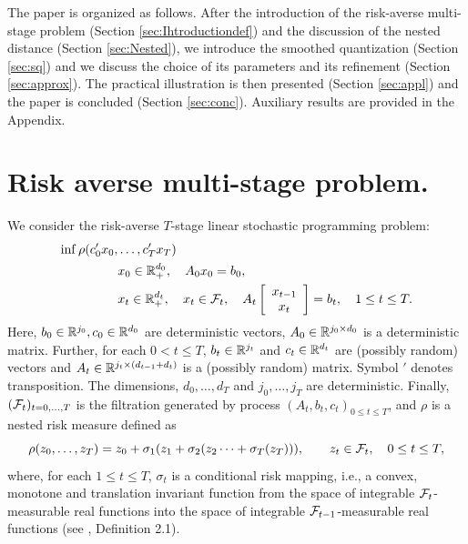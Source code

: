 \documentclass{article}              %
\begin{document}
The paper is organized as follows. After the introduction of the risk-averse
multi-stage problem (Section \ref{sec:Ihtroductiondef}) and the discussion
of the nested distance (Section \ref{sec:Nested}), we introduce the
smoothed quantization (Section \ref{sec:sq}) and we discuss the choice
of its parameters and its refinement (Section \ref{sec:approx}).
The practical illustration is then presented (Section \ref{sec:appl})
and the paper is concluded (Section \ref{sec:conc}). Auxiliary results
are provided in the Appendix.

\section{\label{sec:Ihtroductiondef} Risk averse multi-stage problem.}

We consider the risk-averse $T$-stage linear stochastic programming
problem:
\begin{equation}\label{eq:p}
\begin{split}
\inf\rho(c'_{0}x_{0},&\dots,c'_{T}x_{T})\\
&x_{0}\in\mathbb{R}_{+}^{d_{0}},\quad A_{0}x_{0}=b_{0},\\
&x_{t}\in\mathbb{R}_{+}^{d_{t}},\quad x_{t}\in\mathcal{F}_{t},\quad A_{t}
\left[\begin{array}{c}
x_{t-1}\\
x_{t}
\end{array}\right]=b_{t},\quad1\leq t\leq T.
\end{split}
\end{equation}
Here, $b_{0}\in\mathbb{R}^{j_{0}},c_{0}\in\mathbb{R}^{d_{0}}$ are deterministic vectors,
$A_{0}\in\mathbb{R}^{j_{0}\times d_{0}}$ is a deterministic matrix. Further,
for each $0<t\leq T$, $b_{t}\in\mathbb{R}^{j_{t}}$ and $c_{t}\in\mathbb{R}^{d_{t}}$ are
(possibly random) vectors and $A_{t}\in\mathbb{R}^{j_{t}\times (d_{t-1} + d_t)}$ is
a (possibly random) matrix. Symbol $'$ denotes transposition. The dimensions, $d_{0},\dots,d_{T}$ and
$j_{0},\dots,j_{T}$ are deterministic. Finally, $(\mathcal{F}_{t})_{t=0,\dots,T}$
is the filtration generated by process $(A_{t},b_{t},c_{t})_{0\leq t\leq T}$,
and $\rho$ is a nested risk measure defined as
\[
\rho(z_{0},\dots,z_{T})=z_{0}+\sigma_{1}(z_{1}+\sigma_{2}(z_{2}\dots+\sigma_{T}(z_{T}))),\qquad z_{t}\in\mathcal{F}_{t},\quad0\leq t\leq T,
\]
where, for each $1\leq t\leq T$, $\sigma_{t}$ is a conditional risk
mapping, i.e., a convex, monotone and translation invariant function
from the space of integrable $\mathcal{F}_{t}$-measurable real functions into
the space of integrable $\mathcal{F}_{t-1}$-measurable real functions (see
\cite{ruszczynski2006conditional}, Definition 2.1). 
\end{document}
